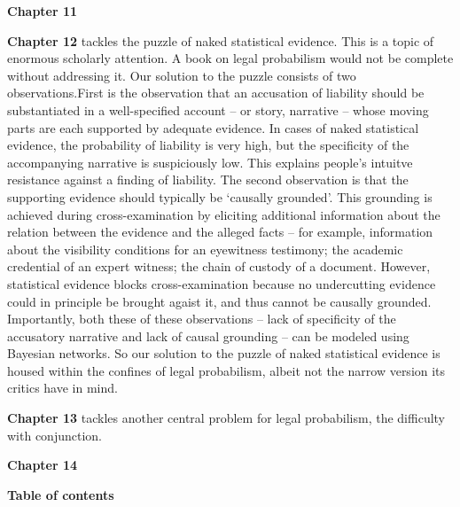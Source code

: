 \documentclass[10pt,dvipsnames,enabledeprecatedfontcommands]{scrartcl}
\begin{document}
\textbf{Chapter 11}

\textbf{Chapter 12} tackles the puzzle of naked statistical evidence.
This is a topic of enormous scholarly attention. A book on legal
probabilism would not be complete without addressing it. Our solution to
the puzzle consists of two observations.First is the observation that an
accusation of liability should be substantiated in a well-specified
account -- or story, narrative -- whose moving parts are each supported
by adequate evidence. In cases of naked statistical evidence, the
probability of liability is very high, but the specificity of the
accompanying narrative is suspiciously low. This explains people's
intuitve resistance against a finding of liability. The second
observation is that the supporting evidence should typically be
`causally grounded'. This grounding is achieved during cross-examination
by eliciting additional information about the relation between the
evidence and the alleged facts -- for example, information about the
visibility conditions for an eyewitness testimony; the academic
credential of an expert witness; the chain of custody of a document.
However, statistical evidence blocks cross-examination because no
undercutting evidence could in principle be brought agaist it, and thus
cannot be causally grounded. Importantly, both these of these
observations -- lack of specificity of the accusatory narrative and lack
of causal grounding -- can be modeled using Bayesian networks. So our
solution to the puzzle of naked statistical evidence is housed within
the confines of legal probabilism, albeit not the narrow version its
critics have in mind.

\textbf{Chapter 13} tackles another central problem for legal
probabilism, the difficulty with conjunction.

\textbf{Chapter 14}

\vspace{3mm}

\noindent \textbf{Table of contents}

\renewcommand{\labelenumi}{\Roman{enumi}}
\renewcommand{\labelenumii}{\arabic{enumii}}
\renewcommand{\labelenumiii}{\arabic{enumii}.\arabic{enumiii}}
\end{document}
